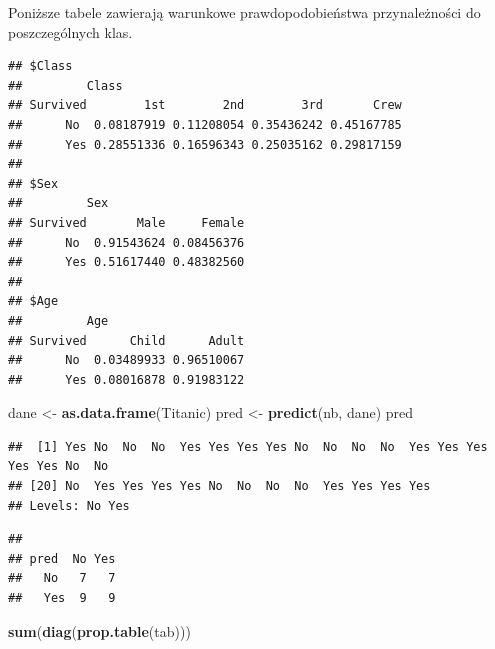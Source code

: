 \documentclass[
]{book}
\newenvironment{Shaded}{\begin{snugshade}}{\end{snugshade}}
\newcommand{\FunctionTok}[1]{\textcolor[rgb]{0.13,0.29,0.53}{\textbf{#1}}}
\newcommand{\NormalTok}[1]{#1}
\newcommand{\OtherTok}[1]{\textcolor[rgb]{0.56,0.35,0.01}{#1}}
\newcommand{\SpecialCharTok}[1]{\textcolor[rgb]{0.81,0.36,0.00}{\textbf{#1}}}
\theoremstyle{plain}
\theoremstyle{definition}
\theoremstyle{definition}
\theoremstyle{definition}
\theoremstyle{definition}
\theoremstyle{definition}
\theoremstyle{remark}
\begin{document}
Poniższe tabele zawierają warunkowe prawdopodobieństwa przynależności do poszczególnych klas.

\begin{Shaded}
\end{Shaded}

\begin{verbatim}
## $Class
##         Class
## Survived        1st        2nd        3rd       Crew
##      No  0.08187919 0.11208054 0.35436242 0.45167785
##      Yes 0.28551336 0.16596343 0.25035162 0.29817159
## 
## $Sex
##         Sex
## Survived       Male     Female
##      No  0.91543624 0.08456376
##      Yes 0.51617440 0.48382560
## 
## $Age
##         Age
## Survived      Child      Adult
##      No  0.03489933 0.96510067
##      Yes 0.08016878 0.91983122
\end{verbatim}

\begin{Shaded}
\begin{Highlighting}[]
\NormalTok{dane }\OtherTok{\textless{}{-}} \FunctionTok{as.data.frame}\NormalTok{(Titanic)}
\NormalTok{pred }\OtherTok{\textless{}{-}} \FunctionTok{predict}\NormalTok{(nb, dane)}
\NormalTok{pred}
\end{Highlighting}
\end{Shaded}

\begin{verbatim}
##  [1] Yes No  No  No  Yes Yes Yes Yes No  No  No  No  Yes Yes Yes Yes Yes No  No 
## [20] No  Yes Yes Yes Yes No  No  No  No  Yes Yes Yes Yes
## Levels: No Yes
\end{verbatim}

\begin{Shaded}
\end{Shaded}

\begin{verbatim}
##      
## pred  No Yes
##   No   7   7
##   Yes  9   9
\end{verbatim}

\begin{Shaded}
\begin{Highlighting}[]
\FunctionTok{sum}\NormalTok{(}\FunctionTok{diag}\NormalTok{(}\FunctionTok{prop.table}\NormalTok{(tab)))}
\end{Highlighting}
\end{Shaded}
\end{document}
